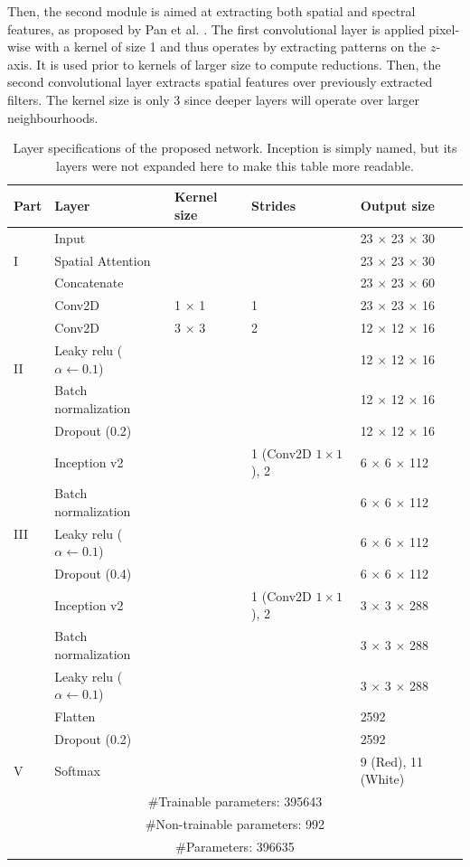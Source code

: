 Then, the second module is aimed at extracting both spatial and spectral features, as proposed by Pan et al. \cite{pan_spectral-spatial_2020}. The first convolutional layer is applied pixel-wise with a kernel of size 1 and thus operates by extracting patterns on the $z$-axis. It is used prior to kernels of larger size to compute reductions. Then, the second convolutional layer extracts spatial features over previously extracted filters. The kernel size is only 3 since deeper layers will operate over larger neighbourhoods.

\newcommand{\kernelSize}[1]{#1 $\times$ #1}
\newcommand{\outputSize}[2]{#1 $\times$ #1 $\times$ #2}
\renewcommand{\arraystretch}{1}
\begin{table}
\centering
\caption{Layer specifications of the proposed network. Inception is simply named, but its layers were not expanded here to make this table more readable.}
\label{table:cnn_architecture}
\begin{tabular}{lllll}
\toprule
Part & Layer & Kernel size & Strides & Output size\\
\midrule
\multirow{3}{*}{I} & Input & & & \outputSize{23}{30}\\
& Spatial Attention & & & \outputSize{23}{30}\\
& Concatenate & & & \outputSize{23}{60}\\
\midrule
\multirow{5}{*}{II} & Conv2D & \kernelSize{1} & 1 & \outputSize{23}{16}\\
& Conv2D & \kernelSize{3} & 2 & \outputSize{12}{16}\\
& Leaky \acrshort{relu} ($\alpha \gets 0.1$) & & & \outputSize{12}{16}\\
& Batch normalization & & & \outputSize{12}{16}\\
& Dropout (0.2) & & & \outputSize{12}{16}\\
\midrule
\multirow{5}{*}{III} & Inception v2 & & 1 (Conv2D $1 \times 1$), 2 & \outputSize{6}{112} \\
& Batch normalization & & & \outputSize{6}{112}\\
& Leaky \acrshort{relu} ($\alpha \gets 0.1$) & & & \outputSize{6}{112}\\
& Dropout (0.4) & & & \outputSize{6}{112}\\
\midrule
\multirow{5}{*}{IV} & Inception v2 & & 1 (Conv2D $1 \times 1$), 2 & \outputSize{3}{288}\\
& Batch normalization & & & \outputSize{3}{288}\\
& Leaky \acrshort{relu} ($\alpha \gets 0.1$) & & & \outputSize{3}{288}\\
& Flatten & & & 2592\\
& Dropout (0.2) & & & 2592\\
\midrule
\multirow{1}{*}{V} & Softmax & & & 9 (Red), 11 (White)\\
\midrule
\multicolumn{5}{c}{\#Trainable parameters: 395643}\\
\multicolumn{5}{c}{\#Non-trainable parameters: 992}\\
\multicolumn{5}{c}{\#Parameters: 396635}\\
\bottomrule
\end{tabular}
\end{table}
\renewcommand{\arraystretch}{1}

